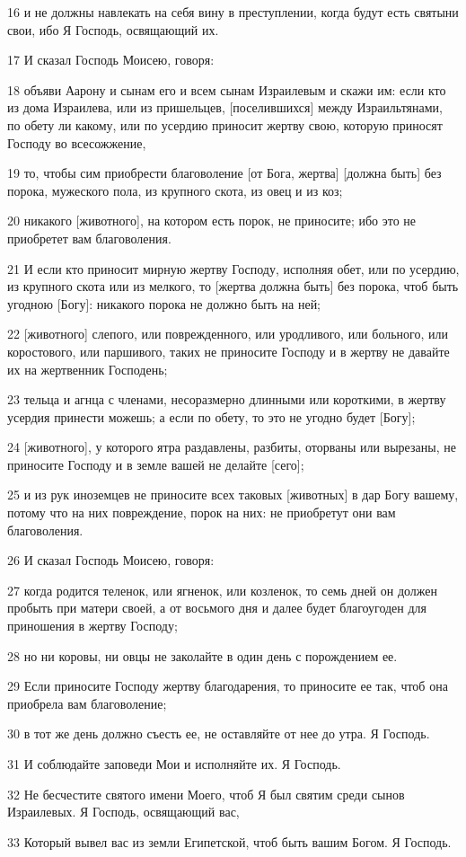 \par 16 и не должны навлекать на себя вину в преступлении, когда будут есть святыни свои, ибо Я Господь, освящающий их.
\par 17 И сказал Господь Моисею, говоря:
\par 18 объяви Аарону и сынам его и всем сынам Израилевым и скажи им: если кто из дома Израилева, или из пришельцев, [поселившихся] между Израильтянами, по обету ли какому, или по усердию приносит жертву свою, которую приносят Господу во всесожжение,
\par 19 то, чтобы сим приобрести благоволение [от Бога, жертва] [должна быть] без порока, мужеского пола, из крупного скота, из овец и из коз;
\par 20 никакого [животного], на котором есть порок, не приносите; ибо это не приобретет вам благоволения.
\par 21 И если кто приносит мирную жертву Господу, исполняя обет, или по усердию, из крупного скота или из мелкого, то [жертва должна быть] без порока, чтоб быть угодною [Богу]: никакого порока не должно быть на ней;
\par 22 [животного] слепого, или поврежденного, или уродливого, или больного, или коростового, или паршивого, таких не приносите Господу и в жертву не давайте их на жертвенник Господень;
\par 23 тельца и агнца с членами, несоразмерно длинными или короткими, в жертву усердия принести можешь; а если по обету, то это не угодно будет [Богу];
\par 24 [животного], у которого ятра раздавлены, разбиты, оторваны или вырезаны, не приносите Господу и в земле вашей не делайте [сего];
\par 25 и из рук иноземцев не приносите всех таковых [животных] в дар Богу вашему, потому что на них повреждение, порок на них: не приобретут они вам благоволения.
\par 26 И сказал Господь Моисею, говоря:
\par 27 когда родится теленок, или ягненок, или козленок, то семь дней он должен пробыть при матери своей, а от восьмого дня и далее будет благоугоден для приношения в жертву Господу;
\par 28 но ни коровы, ни овцы не заколайте в один день с порождением ее.
\par 29 Если приносите Господу жертву благодарения, то приносите ее так, чтоб она приобрела вам благоволение;
\par 30 в тот же день должно съесть ее, не оставляйте от нее до утра. Я Господь.
\par 31 И соблюдайте заповеди Мои и исполняйте их. Я Господь.
\par 32 Не бесчестите святого имени Моего, чтоб Я был святим среди сынов Израилевых. Я Господь, освящающий вас,
\par 33 Который вывел вас из земли Египетской, чтоб быть вашим Богом. Я Господь.

